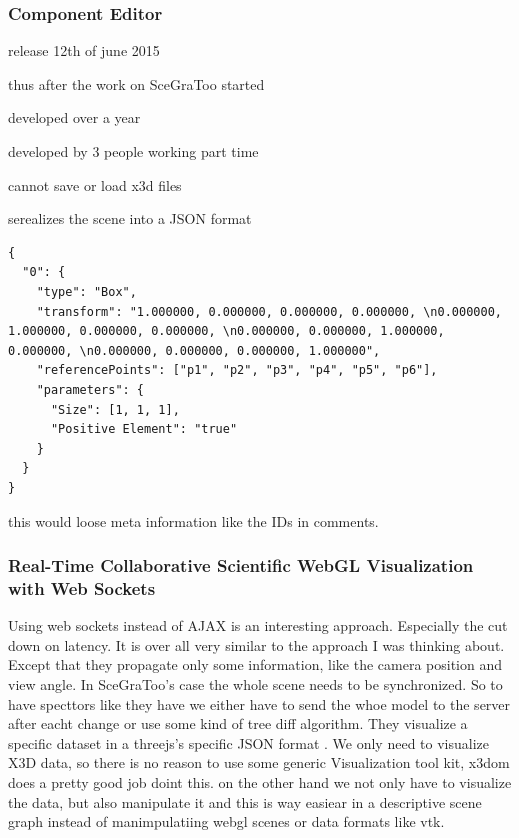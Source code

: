 \clearpage

\subsubsection{Component Editor}
\label{component-editor30}

\begin{itemize*}
\item release 12th of june 2015
\item thus after the work on SceGraToo started
\item developed over a year
\item developed by 3 people working part time
\item cannot save or load x3d files
\item serealizes the scene into a JSON format
\end{itemize*}

\begin{verbatim}
{
  "0": {
    "type": "Box",
    "transform": "1.000000, 0.000000, 0.000000, 0.000000, \n0.000000, 1.000000, 0.000000, 0.000000, \n0.000000, 0.000000, 1.000000, 0.000000, \n0.000000, 0.000000, 0.000000, 1.000000",
    "referencePoints": ["p1", "p2", "p3", "p4", "p5", "p6"],
    "parameters": {
      "Size": [1, 1, 1],
      "Positive Element": "true"
    }
  }
}
\end{verbatim}

\begin{itemize*}
\item
  this would loose meta information like the IDs in comments.
\end{itemize*}

\subsubsection{Real-Time Collaborative Scientific WebGL Visualization with Web Sockets}
\label{rtcswvwws}

Using web sockets instead of AJAX is an interesting approach. \cite{Marion:2012:RCS:2338714.2338721} Especially
the cut down on latency. It is over all very similar to the approach I
was thinking about. Except that they propagate only some information,
like the camera position and view angle. In SceGraToo's case the whole
scene needs to be synchronized. So to have specttors like they have we
either have to send the whoe model to the server after eacht change or
use some kind of tree diff algorithm. They visualize a specific dataset
in a threejs's specific JSON format \cite{threejs-format}. We only need to visualize X3D
data, so there is no reason to use some generic Visualization tool kit,
x3dom does a pretty good job doint this. on the other hand we not only
have to visualize the data, but also manipulate it and this is way
easiear in a descriptive scene graph instead of manimpulatiing webgl
scenes or data formats like vtk.

